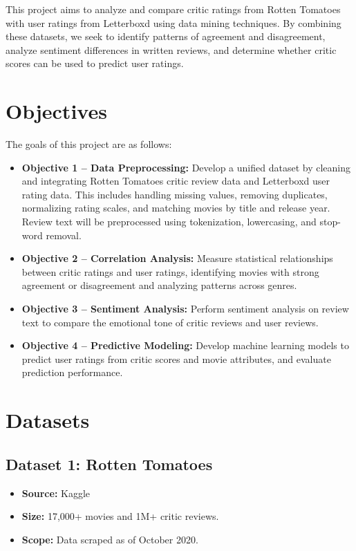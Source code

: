 \documentclass[conference]{IEEEtran}
\begin{document}
This project aims to analyze and compare critic ratings from Rotten Tomatoes
with user ratings from Letterboxd using data mining techniques. By combining
these datasets, we seek to identify patterns of agreement and disagreement,
analyze sentiment differences in written reviews, and determine whether
critic scores can be used to predict user ratings.

\section{Objectives}

The goals of this project are as follows:

\begin{itemize}

  \item \textbf{Objective 1 -- Data Preprocessing:}
        Develop a unified dataset by cleaning and integrating Rotten Tomatoes
        critic review data and Letterboxd user rating data. This includes handling
        missing values, removing duplicates, normalizing rating scales, and matching
        movies by title and release year. Review text will be preprocessed using
        tokenization, lowercasing, and stop-word removal.

  \item \textbf{Objective 2 -- Correlation Analysis:}
        Measure statistical relationships between critic ratings and user ratings,
        identifying movies with strong agreement or disagreement and analyzing
        patterns across genres.

  \item \textbf{Objective 3 -- Sentiment Analysis:}
        Perform sentiment analysis on review text to compare the emotional tone of
        critic reviews and user reviews.

  \item \textbf{Objective 4 -- Predictive Modeling:}
        Develop machine learning models to predict user ratings from critic scores
        and movie attributes, and evaluate prediction performance.

\end{itemize}

\section{Datasets}

\subsection{Dataset 1: Rotten Tomatoes}
\begin{itemize}
  \item \textbf{Source:} Kaggle \cite{leone2020rotten}
  \item \textbf{Size:} 17,000+ movies and 1M+ critic reviews.
  \item \textbf{Scope:} Data scraped as of October 2020.
\end{itemize}
\end{document}
